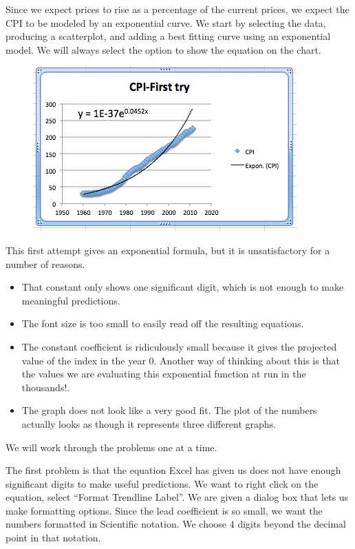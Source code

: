 \documentclass[10pt,]{book}
\theoremstyle{plain}
\theoremstyle{definition}
\theoremstyle{definition}
\begin{document}
%
\par
Since we expect prices to rise as a percentage of the current prices, we expect the CPI to be modeled by an exponential curve.  We start by selecting the data, producing a scatterplot, and adding a best fitting curve using an exponential model.  We will always select the option to show the equation on the chart.

  \leavevmode%
\begin{figure}
\centering
\includegraphics[width=0.8\linewidth]{images/sec1-5-10.png}
\end{figure}
 

%
\par
This first attempt gives an exponential formula, but it is unsatisfactory for a number of reasons.%
\leavevmode%
\begin{itemize}[label=\textbullet]
\item{}That constant only shows one significant digit, which is not enough to make meaningful predictions.%
\item{}The font size is too small to easily read off the resulting equations.%
\item{}The constant coefficient is ridiculously small because it gives the projected value of the index in the year 0. Another way of thinking about this is that the values we are evaluating this exponential function at run in the thousands!.%
\item{}The graph does not look like a very good fit.  The plot of the numbers actually looks as though it represents three different graphs.%
\end{itemize}
\par
We will work through the problems one at a time.

%
\par
The first problem is that the equation Excel has given us does not have enough significant digits to make useful predictions.  We want to right click on the equation, select “Format Trendline Label”.  We are given a dialog box that lets us make formatting options.  Since the lead coefficient is so small, we want the numbers formatted in Scientific notation.  We choose 4 digits beyond the decimal point in that notation.  
\end{document}
